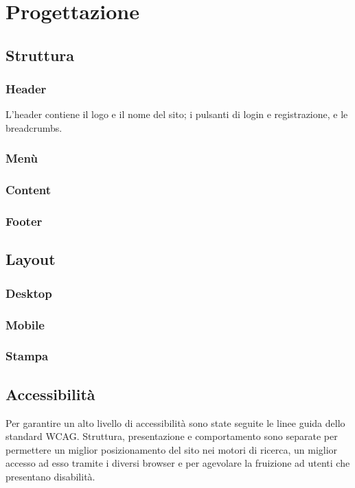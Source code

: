 \documentclass[12pt,a4paper,headings=optiontohead]{article}
\begin{document}
	
	
	\section{Progettazione}
	\subsection{Struttura}
	\subsubsection{Header}
	
	L'header contiene il logo e il nome del sito; i pulsanti di login e registrazione, e le breadcrumbs. 
	
	
	\subsubsection{Menù}
	\subsubsection{Content}
	\subsubsection{Footer}
	
	\subsection{Layout}
	\subsubsection{Desktop}
	\subsubsection{Mobile}
	\subsubsection{Stampa}
	
\subsection{Accessibilità}
	Per garantire un alto livello di accessibilità sono state seguite le linee guida dello standard WCAG. Struttura, presentazione e comportamento sono separate per permettere un miglior posizionamento del sito nei motori di ricerca, un miglior accesso ad esso tramite i diversi browser e per agevolare la fruizione ad utenti che presentano disabilità.
\end{document}
